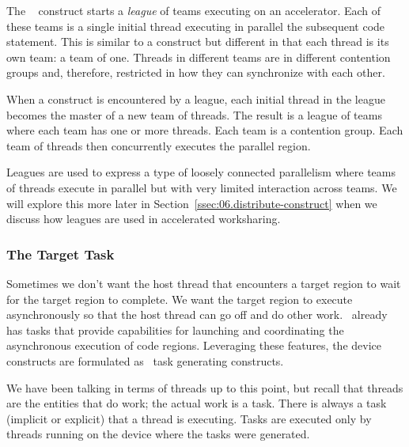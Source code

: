 The ~ construct %
starts a \emph{league} of teams executing
on an accelerator. Each of these teams is a single initial thread executing
in parallel the subsequent code statement.  This is similar to a
 construct but different in that each thread is its own team: a
team of one.  Threads in different teams are in different contention groups
and, therefore, restricted in how they can synchronize with each other.  

When a  construct is encountered by a league, each initial
thread in the league becomes the master of a new team of threads. The result is
a league of teams where each team has one or more threads. Each team is a
contention group.  Each team of threads then concurrently executes the parallel
region.

Leagues are used to express a type of loosely connected parallelism where teams
of threads execute in parallel but with very limited interaction across teams.
We will explore this more later in Section~\ref{ssec:06.distribute-construct}
when we discuss how leagues are used in accelerated worksharing.

\subsubsection{The Target Task}
\label{ssec:06.target-task}

Sometimes we don't want the host thread that encounters a target region to wait
for the target region to complete.  We want the target region to execute
asynchronously so that the host thread can go off and do other work.
\OMP\ already has tasks that provide capabilities for launching and
coordinating the asynchronous execution of code regions.  Leveraging these
features, the device constructs are formulated as \OMP\ task generating
constructs. 

We have been talking in terms of threads up to this point, but recall that
threads are the entities that do work; the actual work is a task.  There is
always a task (implicit or explicit) that a thread is executing.  Tasks are
executed only by threads running on the device where the tasks were generated.

